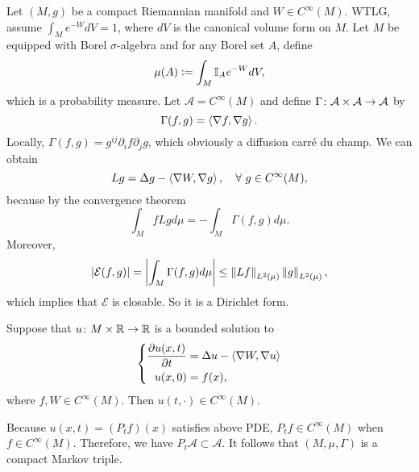 Let $(M,g)$ be a compact Riemannian manifold and $W \in C^\infty(M)$. WTLG, assume $\int_M e^{-W} dV = 1$, where $dV$ is the canonical volume form on $M$. Let $M$ be equipped with Borel $\sigma$-algebra and for any Borel set $A$, define
\begin{equation*}
    \mu(A) \vcentcolon= \int_M \mathbb{I}_Ae^{-W}dV,
\end{equation*}
which is a probability measure. Let $\mathcal{A} = C^\infty(M)$ and define $\Gamma \colon \mathcal{A} \times \mathcal{A} \rightarrow \mathcal{A}$ by
\begin{equation*}
    \Gamma(f,g) = \left\langle \nabla f,\nabla g \right\rangle.
\end{equation*}
Locally, $\Gamma(f,g) = g^{ij}\partial_if \partial_j g$, which obviously a diffusion carr\'e du champ. We can obtain
\begin{equation*}
    Lg = \Delta g - \left\langle \nabla W,\nabla g \right\rangle,\quad \forall~ g \in C^\infty(M),
\end{equation*}
because by the convergence theorem
\begin{equation*}
    \int_M f L g d \mu=-\int_M \Gamma(f, g) d \mu.
\end{equation*}
Moreover, 
\begin{equation*}
   \left\lvert\mathcal{E}(f,g)\right\lvert = \left\lvert\int_M \Gamma(f,g) d\mu\right\lvert \leq \left\lVert Lf\right\lVert_{L^2(\mu)}\left\lVert g\right\lVert_{L^2(\mu)},
\end{equation*}
which implies that $\mathcal{E}$ is closable. So it is a Dirichlet form.

\begin{thm}
    Suppose that $u \colon M \times \mathbb{R} \rightarrow \mathbb{R}$ is a bounded solution to
    \begin{equation*}
        \left\{
            \begin{aligned}
                \frac{\partial u(x,t)}{\partial t} &= \Delta u - \left\langle \nabla W,\nabla u \right\rangle \\
                u(x,0) &= f(x),
            \end{aligned}
        \right.
    \end{equation*}
    where $f,W \in C^\infty(M)$. Then $u(t,\cdot) \in C^\infty(M)$.
\end{thm}
Because $u(x,t) = (P_tf)(x)$ satisfies above PDE, $P_tf \in C^\infty(M)$ when $f \in C^\infty(M)$. Therefore, we have $P_t\mathcal{A} \subset \mathcal{A}$. It follows that $(M,\mu,\Gamma)$ is a compact Markov triple.

